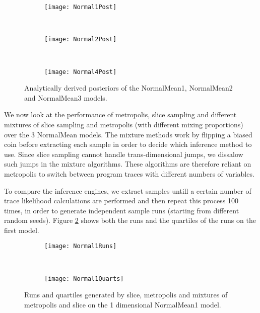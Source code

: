\begin{figure}[h]
        \centering
        \begin{subfigure}[b]{0.31\textwidth}
                \centering
                \texttt{[image: Normal1Post]}
        \end{subfigure}
        ~ 
        \begin{subfigure}[b]{0.31\textwidth}
                \centering
                \texttt{[image: Normal2Post]}
        \end{subfigure}
        ~ 
        \begin{subfigure}[b]{0.31\textwidth}
                \centering
                \texttt{[image: Normal4Post]}
        \end{subfigure}
    \caption{Analytically derived posteriors of the NormalMean1, NormalMean2 and NormalMean3 models.}
    \label{fig:tdfSampDists}
\end{figure}

We now look at the performance of metropolis, slice sampling and different mixtures of slice sampling and metropolis (with different mixing proportions) over the 3 NormalMean models. The mixture methods work by flipping a biased coin before extracting each sample in order to decide which inference method to use. Since slice sampling cannot handle trans-dimensional jumps, we dissalow such jumps in the mixture algorithms. These algorithms are therefore reliant on metropolis to switch between program traces with different numbers of variables. 

To compare the inference engines, we extract samples untill a certain number of trace likelihood calculations are performed and then repeat this process 100 times, in order to generate independent sample runs (starting from different random seeds). Figure \ref{fig:normal1Perf} shows both the runs and the quartiles of the runs on the first model.

\begin{figure}[h]
        \centering
        \begin{subfigure}[b]{0.48\textwidth}
                \centering
                \texttt{[image: Normal1Runs]}
        \end{subfigure}
        ~ 
        \begin{subfigure}[b]{0.48\textwidth}
                \centering
                \texttt{[image: Normal1Quarts]}
        \end{subfigure}
    \caption{Runs and quartiles generated by slice, metropolis and mixtures of metropolis and slice on the 1 dimensional NormalMean1 model.}
    \label{fig:normal1Perf}
\end{figure}

